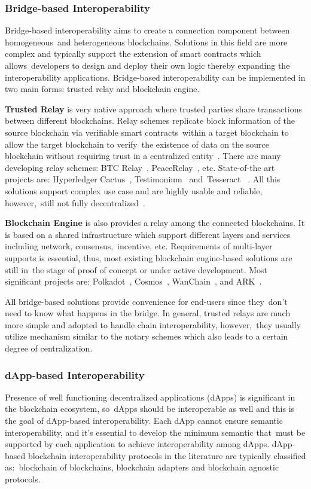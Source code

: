 \subsubsection{Bridge-based Interoperability}
Bridge-based interoperability aims to create a connection component between homogeneous\
and heterogeneous blockchains.
Solutions in this field are more complex and typically support the extension of smart contracts which allows\
developers to design and deploy their own logic thereby expanding the interoperability applications.
Bridge-based interoperability can be implemented in two main forms: trusted relay and blockchain engine.

\textbf{Trusted Relay} is very native approach where trusted parties share transactions between different blockchains.
Relay schemes replicate block information of the source blockchain via verifiable smart contracts\
within a target blockchain to allow the target blockchain to verify\
the existence of data on the source blockchain without requiring trust in a centralized entity~\cite{buterin2016}.
There are many developing relay schemes: BTC Relay~\cite{Chow2016}, PeaceRelay~\cite{Luu2019}, etc.
State-of-the art projects are: Hyperledger Cactus~\cite{Hyperledger2020}, Testimonium~\cite{Frauenthaler2020} and\
Tesseract ~\cite{cryptoeprint:2017/1153}.
All this solutions support complex use case and are highly usable and reliable, however,\
still not fully decentralized~\cite{cryptoeprint:2021/537}.

\textbf{Blockchain Engine} is also provides a relay among the connected blockchains.
It is based on a shared infrastructure which support different layers and services including network, consensus,\
incentive, etc.
Requirements of multi-layer supports is essential, thus, most existing blockchain engine-based solutions are still in\
the stage of proof of concept or under active development.
Most significant projects are: Polkadot~\cite{cryptoeprint:2020/641}, Cosmos~\cite{Kwon2019},
WanChain~\cite{Wanchain}, and ARK~\cite{ARK}.

All bridge-based solutions provide convenience for end-users since they\
don't need to know what happens in the bridge.
In general, trusted relays are much more simple and adopted to handle chain interoperability, however,\
they usually utilize mechanism similar to the notary schemes which also leads to a certain degree of centralization.

\subsubsection{dApp-based Interoperability}
Presence of well functioning decentralized applications (dApps) is significant in the blockchain ecosystem, so\
dApps should be interoperable as well and this is the goal of dApp-based interoperability.
Each dApp cannot ensure semantic interoperability, and it's essential to develop the minimum semantic that\
must be supported by each application to achieve interoperability among dApps.
dApp-based blockchain interoperability protocols in the literature are typically classified as:\
blockchain of blockchains, blockchain adapters and blockchain agnostic protocols.


